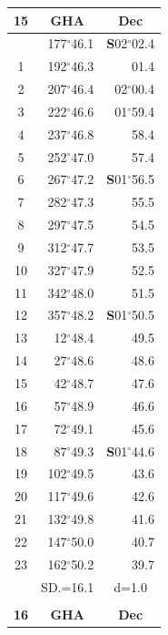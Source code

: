 \documentclass[10pt, a4paper]{report}
\begin{document}
\begin{scriptsize}
\begin{tabular*}{0.2\textwidth}[t]{@{\extracolsep{\fill}}|c|rr|}
\hline
\multicolumn{1}{|c|}{\rule{0pt}{2.6ex}\textbf{15}} & \multicolumn{1}{c}{\textbf{GHA}} & \multicolumn{1}{c|}{\textbf{Dec}}\\
\hline\rule{0pt}{2.6ex}\noindent
0 & 177$^\circ$46.1 & \textbf{S}02$^\circ$02.4\\
1 & 192$^\circ$46.3 & 01.4\\
2 & 207$^\circ$46.4 & 02$^\circ$00.4\\
3 & 222$^\circ$46.6 & 01$^\circ$59.4\\
4 & 237$^\circ$46.8 & 58.4\\
5 & 252$^\circ$47.0 & 57.4\\[2Pt]
6 & 267$^\circ$47.2 & \textbf{S}01$^\circ$56.5\\
7 & 282$^\circ$47.3 & 55.5\\
8 & 297$^\circ$47.5 & 54.5\\
9 & 312$^\circ$47.7 & \raisebox{0.24ex}{\boldmath$\cdot$~\boldmath$\cdot$~~}53.5\\
10 & 327$^\circ$47.9 & 52.5\\
11 & 342$^\circ$48.0 & 51.5\\[2Pt]
12 & 357$^\circ$48.2 & \textbf{S}01$^\circ$50.5\\
13 & 12$^\circ$48.4 & 49.5\\
14 & 27$^\circ$48.6 & 48.6\\
15 & 42$^\circ$48.7 & \raisebox{0.24ex}{\boldmath$\cdot$~\boldmath$\cdot$~~}47.6\\
16 & 57$^\circ$48.9 & 46.6\\
17 & 72$^\circ$49.1 & 45.6\\[2Pt]
18 & 87$^\circ$49.3 & \textbf{S}01$^\circ$44.6\\
19 & 102$^\circ$49.5 & 43.6\\
20 & 117$^\circ$49.6 & 42.6\\
21 & 132$^\circ$49.8 & \raisebox{0.24ex}{\boldmath$\cdot$~\boldmath$\cdot$~~}41.6\\
22 & 147$^\circ$50.0 & 40.7\\
23 & 162$^\circ$50.2 & 39.7\\
\hline
\rule{0pt}{2.4ex} & \multicolumn{1}{c}{SD.=16.1} & \multicolumn{1}{c|}{d=1.0}\\
\hline
\multicolumn{1}{c}{}\\[-0.5ex]\hline
\multicolumn{1}{|c|}{\rule{0pt}{2.6ex}\textbf{16}} & \multicolumn{1}{c}{\textbf{GHA}} & \multicolumn{1}{c|}{\textbf{Dec}}\\

\end{tabular*}
\end{scriptsize}
\end{document}
